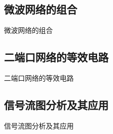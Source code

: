 \subsection{微波网络的组合}
\begin{frame}{微波网络的组合}

\end{frame}

\subsection{二端口网络的等效电路}
\begin{frame}{二端口网络的等效电路}

\end{frame}

\subsection{信号流图分析及其应用}
\begin{frame}{信号流图分析及其应用}

\end{frame}

